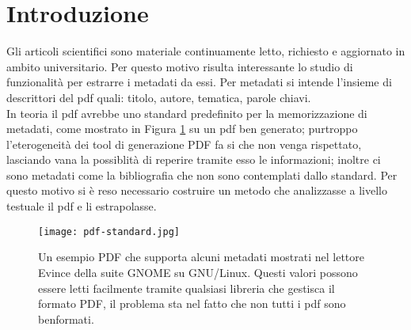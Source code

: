 \section{Introduzione}\label{intro}

Gli articoli scientifici sono materiale continuamente letto, richiesto e aggiornato in ambito universitario. Per questo motivo risulta interessante lo studio di funzionalità per estrarre i metadati da essi. Per metadati si intende l'insieme di descrittori del pdf quali: titolo, autore, tematica, parole chiavi.\\ In teoria il pdf avrebbe uno standard predefinito per la memorizzazione di metadati, come mostrato in Figura \ref{fig:standard} su un pdf ben generato; purtroppo l'eterogeneità dei tool di generazione PDF fa si che non venga rispettato, lasciando vana la possiblità di reperire tramite esso le informazioni; inoltre ci sono metadati come la bibliografia che non sono contemplati dallo standard. Per questo motivo si è reso necessario costruire un metodo che analizzasse a livello testuale il pdf e li estrapolasse.\\

\begin{figure}[htb]
\begin{center}
\texttt{[image: pdf-standard.jpg]}
\end{center}
\caption[Un esempio PDF che supporta alcuni metadati]{Un esempio PDF che supporta alcuni metadati mostrati nel lettore Evince della suite GNOME su GNU/Linux. Questi valori possono essere letti facilmente tramite qualsiasi libreria che gestisca il formato PDF, il problema sta nel fatto che non tutti i pdf sono benformati.}
\label{fig:standard}
\end{figure}


